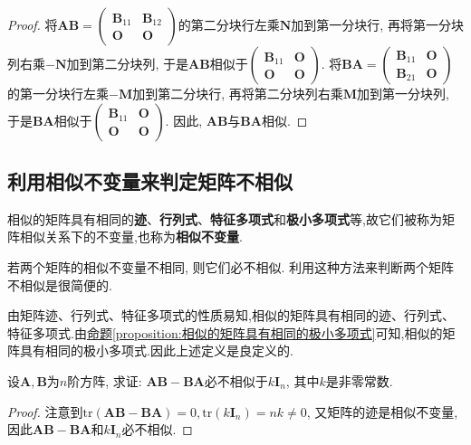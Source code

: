 \documentclass[../../main.tex]{subfiles}%
\begin{document}
\begin{proof}
将\(\boldsymbol{AB}=\begin{pmatrix}\boldsymbol{B}_{11}&\boldsymbol{B}_{12}\\\boldsymbol{O}&\boldsymbol{O}\end{pmatrix}\)的第二分块行左乘\(\boldsymbol{N}\)加到第一分块行, 再将第一分块列右乘\(-\boldsymbol{N}\)加到第二分块列, 于是\(\boldsymbol{AB}\)相似于\(\begin{pmatrix}\boldsymbol{B}_{11}&\boldsymbol{O}\\\boldsymbol{O}&\boldsymbol{O}\end{pmatrix}\). 将\(\boldsymbol{BA}=\begin{pmatrix}\boldsymbol{B}_{11}&\boldsymbol{O}\\\boldsymbol{B}_{21}&\boldsymbol{O}\end{pmatrix}\)的第一分块行左乘\(-\boldsymbol{M}\)加到第二分块行, 再将第二分块列右乘\(\boldsymbol{M}\)加到第一分块列, 于是\(\boldsymbol{BA}\)相似于\(\begin{pmatrix}\boldsymbol{B}_{11}&\boldsymbol{O}\\\boldsymbol{O}&\boldsymbol{O}\end{pmatrix}\). 因此, \(\boldsymbol{AB}\)与\(\boldsymbol{BA}\)相似.

\end{proof}

\subsection{利用相似不变量来判定矩阵不相似}

\begin{definition}[相似不变量]
相似的矩阵具有相同的\textbf{迹}、\textbf{行列式}、\textbf{特征多项式}和\textbf{极小多项式}等,故它们被称为矩阵相似关系下的不变量,也称为\textbf{相似不变量}. 
\end{definition}
\begin{remark}
若两个矩阵的相似不变量不相同, 则它们必不相似. 利用这种方法来判断两个矩阵不相似是很简便的. 
\end{remark}
\begin{note}
由矩阵迹、行列式、特征多项式的性质易知,相似的矩阵具有相同的迹、行列式、特征多项式.由\hyperref[proposition:相似的矩阵具有相同的极小多项式]{命题\ref{proposition:相似的矩阵具有相同的极小多项式}}可知,相似的矩阵具有相同的极小多项式.因此上述定义是良定义的.
\end{note}

\begin{example}
设\(\boldsymbol{A},\boldsymbol{B}\)为\(n\)阶方阵, 求证: \(\boldsymbol{AB}-\boldsymbol{BA}\)必不相似于\(k\boldsymbol{I}_{n}\), 其中\(k\)是非零常数.
\end{example}
\begin{proof}

注意到\(\mathrm{tr}(\boldsymbol{AB}-\boldsymbol{BA}) = 0,\mathrm{tr}(k\boldsymbol{I}_{n}) = nk\neq 0\), 又矩阵的迹是相似不变量, 因此\(\boldsymbol{AB}-\boldsymbol{BA}\)和\(k\boldsymbol{I}_{n}\)必不相似.

\end{proof}
\end{document}
